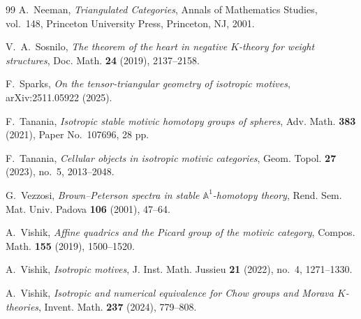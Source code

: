 \documentclass[11pt]{amsart}
\numberwithin{equation}{section}
\theoremstyle{definition}
\theoremstyle{remark}
\begin{document}
\begin{thebibliography}{99}
A.~Neeman,
\emph{Triangulated Categories},
Annals of Mathematics Studies, vol.~148, Princeton University Press,
Princeton, NJ, 2001.

V.~A.~Sosnilo,
\emph{The theorem of the heart in negative $K$-theory for weight structures},
Doc. Math. \textbf{24} (2019), 2137--2158.

F.~Sparks,
\emph{On the tensor-triangular geometry of isotropic motives},
arXiv:2511.05922 (2025).

F.~Tanania,
\emph{Isotropic stable motivic homotopy groups of spheres},
Adv. Math. \textbf{383} (2021), Paper No.~107696, 28 pp.

F.~Tanania,
\emph{Cellular objects in isotropic motivic categories},
Geom. Topol. \textbf{27} (2023), no.~5, 2013--2048.

G.~Vezzosi,
\emph{Brown--Peterson spectra in stable $\mathbb A^1$-homotopy theory},
Rend. Sem. Mat. Univ. Padova \textbf{106} (2001), 47--64.

A.~Vishik,
\emph{Affine quadrics and the Picard group of the motivic category},
Compos. Math. \textbf{155} (2019), 1500--1520.

A.~Vishik,
\emph{Isotropic motives},
J. Inst. Math. Jussieu \textbf{21} (2022), no.~4, 1271--1330.

A.~Vishik,
\emph{Isotropic and numerical equivalence for Chow groups and Morava
$K$-theories},
Invent. Math. \textbf{237} (2024), 779--808.

\end{thebibliography}
\end{document}
